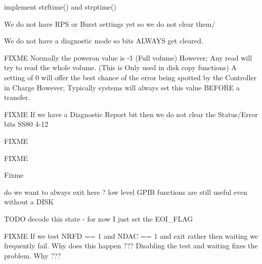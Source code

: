 
\begin{DoxyRefList}
\item[\label{todo__todo000001}%
\hypertarget{todo__todo000001}{}%
Global \hyperlink{time_8h_a7ffc52def0c7fbf70c50248e3f7d6a8a}{asctime\+\_\+r} (tm\+\_\+t $\ast$t, char $\ast$buf)]implement strftime() and strptime()  
\item[\label{todo__todo000045}%
\hypertarget{todo__todo000045}{}%
Global \hyperlink{ss80_8h_aa48ccb1479e226dacfaa1dac15631a9d}{Clear\+\_\+\+Common} (int u)]We do not have R\+PS or Burst settings yet so we do not clear them/ 

We do not have a diagnostic mode so bits A\+L\+W\+A\+YS get cleared. 

F\+I\+X\+ME Normally the poweron value is -\/1 (Full volume) However; Any read will try to read the whole volume. (This is Only used in disk copy functions) A setting of 0 will offer the best chance of the error being spotted by the Controller in Charge However; Typically systems will always set this value B\+E\+F\+O\+RE a transfer. 

F\+I\+X\+ME If we have a Diagnostic Report bit then we do not clear the Status/\+Error bits S\+S80 4-\/12  
\item[\label{todo__todo000006}%
\hypertarget{todo__todo000006}{}%
Global \hyperlink{gpib__task_8h_ac63d4e431ab55dddfbf436d87135128e}{G\+P\+IB} (uint8\+\_\+t ch)]F\+I\+X\+ME 

F\+I\+X\+ME 

Fixme  
\item[\label{todo__todo000005}%
\hypertarget{todo__todo000005}{}%
Global \hyperlink{gpib__task_8h_a903eb44d83bf8f2db71e6f32a35fec62}{gpib\+\_\+error\+\_\+test} (uint16\+\_\+t val)]do we want to always exit here ? low level G\+P\+IB functions are still useful even without a D\+I\+SK  
\item[\label{todo__todo000004}%
\hypertarget{todo__todo000004}{}%
Global \hyperlink{gpib_8h_a67f7cdca85091b3eb0eea0051a200fbe}{gpib\+\_\+read\+\_\+str} (uint8\+\_\+t $\ast$buf, int size, uint16\+\_\+t $\ast$status)]T\+O\+DO decode this state -\/ for now I just set the E\+O\+I\+\_\+\+F\+L\+AG  
\item[\label{todo__todo000002}%
\hypertarget{todo__todo000002}{}%
Global \hyperlink{gpib_8h_ac3d50cc1d56705d107e2f8fb00692e68}{gpib\+\_\+write\+\_\+byte} (uint16\+\_\+t ch)]F\+I\+X\+ME If we test N\+R\+FD == 1 and N\+D\+AC == 1 and exit rather then waiting we frequently fail. Why does this happen ??? Disabling the test and waiting fixes the problem. Why ??? 


\end{DoxyRefList}

